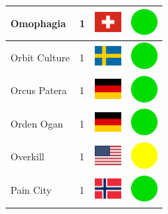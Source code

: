 \documentclass[12pt, a4paper, twoside]{report}
\begin{document}
\begin{center}
\begin{longtable}{|p{5cm}|p{2cm}|p{2cm}|p{2cm}|}
			Omophagia & 1 & \includegraphics[width=1cm]{4x3/ch} & \includegraphics[width=1cm]{likes/y} \\ \hline
			Orbit Culture & 1 & \includegraphics[width=1cm]{4x3/se} & \includegraphics[width=1cm]{likes/y} \\ \hline
			Orcus Patera & 1 & \includegraphics[width=1cm]{4x3/de} & \includegraphics[width=1cm]{likes/y} \\ \hline
			Orden Ogan & 1 & \includegraphics[width=1cm]{4x3/de} & \includegraphics[width=1cm]{likes/y} \\ \hline
			Overkill & 1 & \includegraphics[width=1cm]{4x3/us} & \includegraphics[width=1cm]{likes/m} \\ \hline
			Pain City & 1 & \includegraphics[width=1cm]{4x3/no} & \includegraphics[width=1cm]{likes/y} \\ \hline

\end{longtable}
\end{center}
\end{document}
